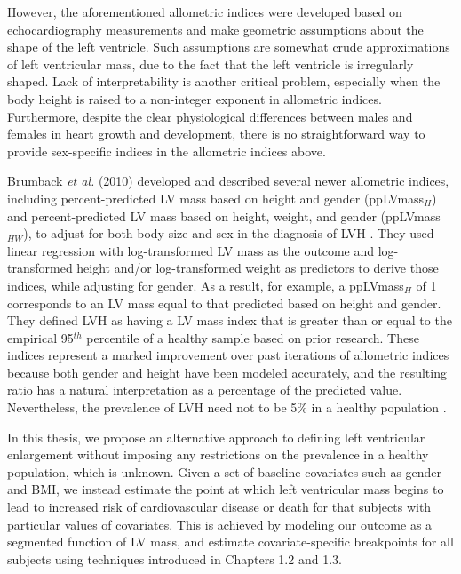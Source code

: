 \documentclass [12pt, proquest] {uwthesis}[2016/11/22]
\begin{document}
However, the aforementioned allometric indices were developed based on echocardiography measurements and make geometric assumptions about the shape of the left ventricle. Such assumptions are somewhat crude approximations of left ventricular mass, due to the fact that the left ventricle is irregularly shaped. Lack of interpretability is another critical problem, especially when the body height is raised to a non-integer exponent in allometric indices. Furthermore, despite the clear physiological differences between males and females in heart growth and development, there is no straightforward way to provide sex-specific indices in the allometric indices above.

Brumback \textit{et al.} (2010) developed and described several newer allometric indices, including percent-predicted LV mass based on height and gender (ppLVmass$_H$) and percent-predicted LV mass based on height, weight, and gender (ppLVmass$_{HW}$), to adjust for both body size and sex in the diagnosis of LVH \cite{LB2010}. They used linear regression with log-transformed LV mass as the outcome and log-transformed height and/or log-transformed weight as predictors to derive those indices, while adjusting for gender. As a result, for example, a ppLVmass$_H$ of 1 corresponds to an LV mass equal to that predicted based on height and gender. They defined LVH as having a LV mass index that is greater than or equal to the empirical 95$^{th}$ percentile of a healthy sample based on prior research. These indices represent a marked improvement over past iterations of allometric indices because both gender and height have been modeled accurately, and the resulting ratio has a natural interpretation as a percentage of the predicted value. Nevertheless, the prevalence of LVH need not to be 5\% in a healthy population \cite{DM2019}.

In this thesis, we propose an alternative approach to defining left ventricular enlargement without imposing any restrictions on the prevalence in a healthy population, which is unknown. Given a set of baseline covariates such as gender and BMI, we instead estimate the point at which left ventricular mass begins to lead to increased risk of cardiovascular disease or death for that subjects with particular values of covariates. This is achieved by modeling our outcome as a segmented function of LV mass, and estimate covariate-specific breakpoints for all subjects using techniques introduced in Chapters 1.2 and 1.3.

 
\end{document}
